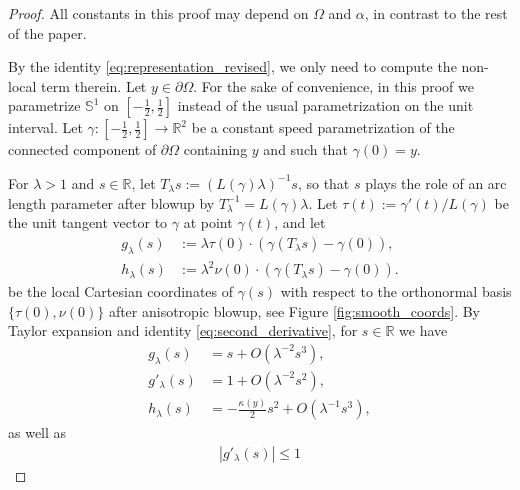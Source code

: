 \documentclass[11pt]{article}
\numberwithin{statement}{section}
\numberwithin{equation}{section}
\theoremstyle{remark}
\newcommand{\R}{\mathbb R} 				%
\begin{document}
   \begin{proof}
     All constants in this proof may depend on $\Omega$ and
       $\alpha$, in contrast to the rest of the paper.
	
     By the identity \eqref{eq:representation_revised}, we only need
     to compute the non-local term therein.  Let
     $y \in \partial \Omega$.  For the sake of convenience, in this
     proof we parametrize $\mathbb{S}^1$ on
     $[-\frac{1}{2},\frac{1}{2}]$ instead of the usual parametrization
     on the unit interval. Let
     $\gamma : [-\frac{1}{2},\frac{1}{2}] \to \R^2$ be a constant
     speed parametrization of the connected component of
     $\partial \Omega$ containing $y$ and such that $\gamma(0) = y$.
		
     For $\lambda>1$ and $s \in \R$, let
     $T_\lambda s := (L(\gamma) \lambda)^{-1} s$, so that $s$ plays
     the role of an arc length parameter after blowup by
       $T_\lambda^{-1} = L(\gamma) \lambda$.  Let $\tau(t) :=
       \gamma'(t) / L(\gamma)$ be the unit tangent vector to $\gamma$
       at point $\gamma(t)$, and let
	\begin{align}
          g_{\lambda}(s) & := \lambda
                           \tau(0) \cdot
                           \left(\gamma(T_\lambda s) - \gamma(0
                           )\right), \label{def:g_upper}\\ 
          h_{\lambda}(s) & := \lambda^2 \nu(0) \cdot
                           \left(\gamma(T_\lambda s ) - \gamma(0
                           )\right).\label{def:h_upper} 
	\end{align}
	be the local Cartesian coordinates of $\gamma(s)$ with respect
        to the orthonormal basis $\{ \tau(0) ,\nu(0)\}$ after
        anisotropic blowup, see Figure \ref{fig:smooth_coords}.  By
        Taylor expansion and identity \eqref{eq:second_derivative},
        for $s \in \R$ we have
	\begin{align}
          g_{\lambda}(s) & = s +
                           O(\lambda^{-2}s^3),\label{eq:g_upper}\\ 
          g'_{\lambda}(s) & = 1 + O(
                            \lambda^{-2}s^2),\label{eq:gprime_upper}\\ 
          h_{\lambda}(s) & = - \frac{ \kappa(y)}{2}s^2+
                           O(\lambda^{-1}s^3),\label{eq:h_upper}  
	\end{align}
	as well as
	\begin{align}\label{eq:gprime_mod}
		|g'_{\lambda}(s)| \leq 1
	\end{align}

\end{proof}
\end{document}
